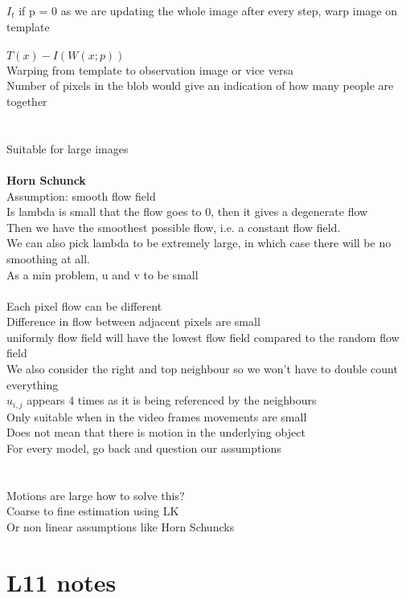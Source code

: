 \documentclass[11pt]{article}
\begin{document}
$I_{t}$ if p = 0 as we are updating the whole image after every step, warp image on template\\\\
$T(x) - I(W(x;p))$ 
\\Warping from template to observation image or vice versa
\\
Number of pixels in the blob would give an indication of how many people are together
\\\\
\\Suitable for large images
\\\\
\textbf{Horn Schunck}\\
Assumption: smooth flow field\\
Is lambda is small that the flow goes to 0, then it gives a degenerate flow\\
Then we have the smoothest possible flow, i.e. a constant flow field.\\
We can also pick lambda to be extremely large, in which case there will be no smoothing at all.
\\
As a min problem, u and v to be small \\
\\
Each pixel flow can be different
\\
Difference in flow between adjacent pixels are small
\\
uniformly flow field will have the lowest flow field compared to the random flow field
\\
We also consider the right and top neighbour so we won't have to double count everything
\\
$u_{i, j}$ appears 4 times as it is being referenced by the neighbours
\\
Only suitable when in the video frames movements are small
\\
Does not mean that there is motion in the underlying object\\
For every model, go back and question our assumptions\\
\\\\
Motions are large how to solve this?\\
Coarse to fine estimation using LK
\\
Or non linear assumptions like Horn Schuncks
\\
\section*{L11 notes}
\end{document}
